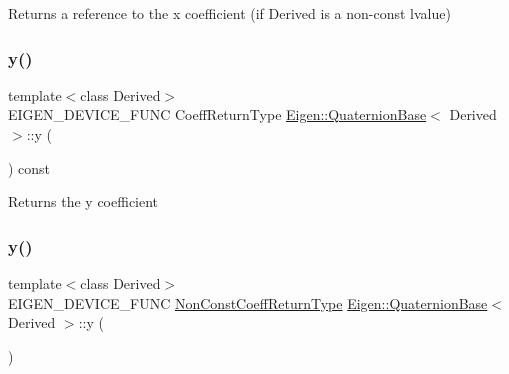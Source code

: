 \begin{DoxyReturn}{Returns}
a reference to the {\ttfamily x} coefficient (if Derived is a non-\/const lvalue) 
\end{DoxyReturn}
\mbox{\label{class_eigen_1_1_quaternion_base_a77a62575ed017e4086145714db4e6502}} 
\subsubsection{\texorpdfstring{y()}{y()}\hspace{0.1cm}{\footnotesize\ttfamily [1/2]}}
{\footnotesize\ttfamily template$<$class Derived$>$ \\
E\+I\+G\+E\+N\+\_\+\+D\+E\+V\+I\+C\+E\+\_\+\+F\+U\+NC Coeff\+Return\+Type \mbox{\hyperlink{class_eigen_1_1_quaternion_base}{Eigen\+::\+Quaternion\+Base}}$<$ Derived $>$\+::y (\begin{DoxyParamCaption}{ }\end{DoxyParamCaption}) const\hspace{0.3cm}{\ttfamily [inline]}}

\begin{DoxyReturn}{Returns}
the {\ttfamily y} coefficient 
\end{DoxyReturn}
\mbox{\label{class_eigen_1_1_quaternion_base_aa4bf2ff0e4aa4b57d1d16ce21d17066f}} 
\subsubsection{\texorpdfstring{y()}{y()}\hspace{0.1cm}{\footnotesize\ttfamily [2/2]}}
{\footnotesize\ttfamily template$<$class Derived$>$ \\
E\+I\+G\+E\+N\+\_\+\+D\+E\+V\+I\+C\+E\+\_\+\+F\+U\+NC \mbox{\hyperlink{struct_eigen_1_1internal_1_1true__type}{Non\+Const\+Coeff\+Return\+Type}} \mbox{\hyperlink{class_eigen_1_1_quaternion_base}{Eigen\+::\+Quaternion\+Base}}$<$ Derived $>$\+::y (\begin{DoxyParamCaption}{ }\end{DoxyParamCaption})\hspace{0.3cm}{\ttfamily [inline]}}


